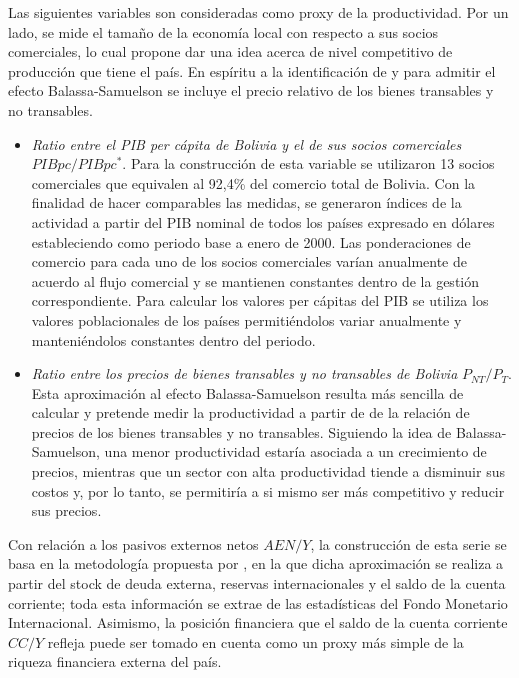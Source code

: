 \documentclass[12pt,letterpaper]{article}
\begin{document}
Las siguientes variables son consideradas como proxy de la productividad. Por un lado, se mide el tamaño de la economía local con respecto a sus socios comerciales, lo cual propone dar una idea acerca de nivel competitivo de producción que tiene el país. En espíritu a la identificación de \cite{clark1999exchange} y para admitir el efecto Balassa-Samuelson se incluye el precio relativo de los bienes transables y no transables.
\begin{itemize}
\item \emph{Ratio entre el PIB per cápita de Bolivia y el de sus socios comerciales} $PIBpc/PIBpc^*$. Para la construcción de esta variable se utilizaron 13 socios comerciales que equivalen al 92,4\% del comercio total de Bolivia. Con la finalidad de hacer comparables las medidas, se generaron índices de la actividad a partir del PIB nominal de todos los países expresado en dólares estableciendo como periodo base a enero de 2000. Las ponderaciones de comercio para cada uno de los socios comerciales varían anualmente de acuerdo al flujo comercial y se mantienen constantes dentro de la gestión correspondiente. Para calcular los valores per cápitas del PIB se utiliza los valores poblacionales de los países permitiéndolos variar anualmente y manteniéndolos constantes dentro del periodo. 
\item \emph{Ratio entre los precios de bienes transables y no transables de Bolivia} $P_{NT}/P_T$. Esta aproximación al efecto Balassa-Samuelson resulta más sencilla de calcular y pretende medir la productividad a partir de de la relación de precios de los bienes transables y no transables. Siguiendo la idea de Balassa-Samuelson, una menor productividad estaría asociada a un crecimiento de precios, mientras que un sector con alta productividad tiende a disminuir sus costos y, por lo tanto, se permitiría a si mismo ser más competitivo y reducir sus precios. 
\end{itemize}

Con relación a los pasivos externos netos $AEN/Y$, la construcción de esta serie se basa en la metodología propuesta por \cite{lane2001wealth}, en la que dicha aproximación se realiza a partir del stock de deuda externa, reservas internacionales y el saldo de la cuenta corriente; toda esta información se extrae de las estadísticas del Fondo Monetario Internacional. Asimismo, la posición financiera que el saldo de la cuenta corriente $CC/Y$ refleja puede ser tomado en cuenta como un proxy más simple de la riqueza financiera externa del país. 
\end{document}
